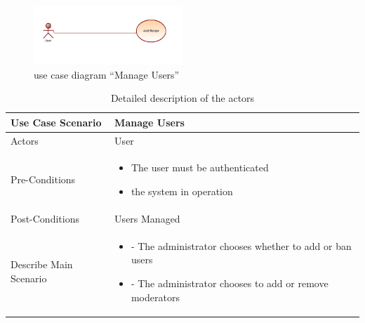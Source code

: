 \documentclass{article}
\begin{document}
{{{\newpage


\begin{figure}[htbp]
    \centering
    \includegraphics[width=0.5\textwidth]{Addrecipee}
    \caption{use case diagram “Manage Users”}
    \label{fig:design2}
\end{figure}
\begin{table}[h]
    \centering
    \begin{tabularx}{\textwidth}{X|X}
        \toprule
        Use Case Scenario & Manage Users \\
        \midrule
        Actors & User \\
        \midrule
        Pre-Conditions & \begin{itemize}[label=$\bullet$]
\item The user must be authenticated 
\item the system in operation
 \end{itemize} \\
        \midrule
	 Post-Conditions & Users Managed  \\
        \midrule
        Describe Main Scenario &  \begin{itemize}[label=$\bullet$]
            \item - The administrator chooses whether to add or ban users
            \item- The administrator chooses to add or remove moderators
    
        \end{itemize} \\
        \bottomrule
    \end{tabularx}
    \caption{Detailed description of the actors}
    \label{tab:actors_roles}
\end{table}





















\newpage




}}}
\end{document}
